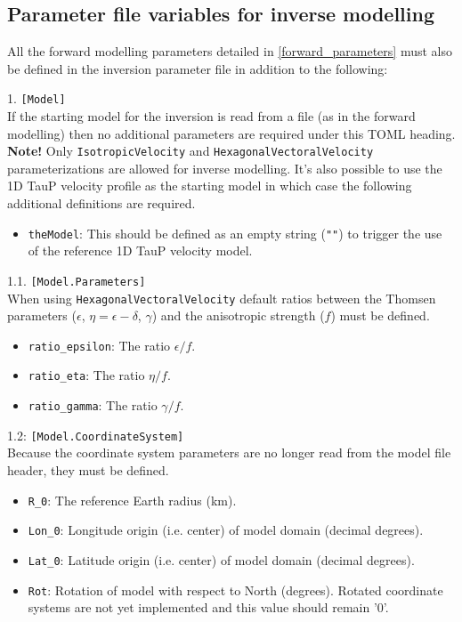\subsection{Parameter file variables for inverse modelling} \label{inverse_parameters}
All the forward modelling parameters detailed in \ref{forward_parameters} must also be defined in the inversion parameter file in addition to the following:

1. \texttt{[Model]}\\
If the starting model for the inversion is read from a file (as in the forward modelling) then no additional parameters are required under this TOML heading. \textbf{Note!} Only \texttt{IsotropicVelocity} and \texttt{HexagonalVectoralVelocity} parameterizations are allowed for inverse modelling. It's also possible to use the 1D TauP velocity profile as the starting model in which case the following additional definitions are required.
\begin{itemize}
\item \texttt{theModel}: This should be defined as an empty string (\texttt{""}) to trigger the use of the reference 1D TauP velocity model.
\end{itemize}

1.1. \texttt{[Model.Parameters]}\\
When using \texttt{HexagonalVectoralVelocity} default ratios between the Thomsen parameters ($\epsilon$, $\eta = \epsilon - \delta$, $\gamma$) and the anisotropic strength ($f$) must be defined.
\begin{itemize}
\item \texttt{ratio\_epsilon}: The ratio $\epsilon/f$.
\item \texttt{ratio\_eta}: The ratio $\eta/f$.
\item \texttt{ratio\_gamma}: The ratio $\gamma/f$.
\end{itemize}

1.2: \texttt{[Model.CoordinateSystem]}\\
Because the coordinate system parameters are no longer read from the model file header, they must be defined.
\begin{itemize}
\item \texttt{R\_0}: The reference Earth radius (km).
\item \texttt{Lon\_0}: Longitude origin (i.e. center) of model domain (decimal degrees).
\item \texttt{Lat\_0}: Latitude origin (i.e. center) of model domain (decimal degrees).
\item \texttt{Rot}: Rotation of model with respect to North (degrees). Rotated coordinate systems are not yet implemented and this value should remain '0'.
\end{itemize}

